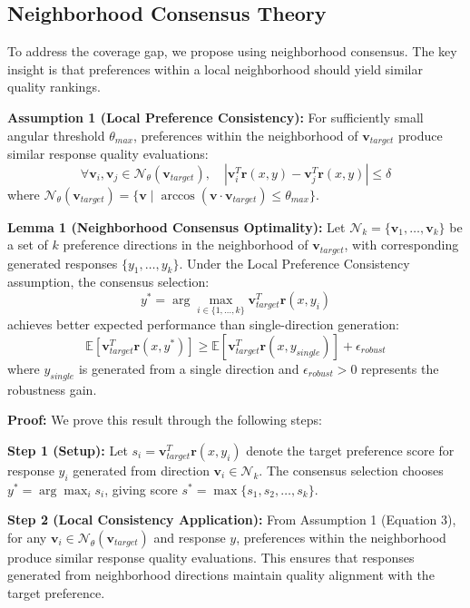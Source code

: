 \documentclass{article} %
\begin{document}
\subsection{Neighborhood Consensus Theory}

To address the coverage gap, we propose using neighborhood consensus. The key insight is that preferences within a local neighborhood should yield similar quality rankings.

\textbf{Assumption 1 (Local Preference Consistency):} For sufficiently small angular threshold $\theta_{max}$, preferences within the neighborhood of $\mathbf{v}_{target}$ produce similar response quality evaluations:
\begin{equation}
\forall \mathbf{v}_i, \mathbf{v}_j \in \mathcal{N}_\theta(\mathbf{v}_{target}), \quad |\mathbf{v}_i^T \mathbf{r}(x,y) - \mathbf{v}_j^T \mathbf{r}(x,y)| \leq \delta
\end{equation}
where $\mathcal{N}_\theta(\mathbf{v}_{target}) = \{\mathbf{v} \mid \arccos(\mathbf{v} \cdot \mathbf{v}_{target}) \leq \theta_{max}\}$.

\textbf{Lemma 1 (Neighborhood Consensus Optimality):} Let $\mathcal{N}_k = \{\mathbf{v}_1, \ldots, \mathbf{v}_k\}$ be a set of $k$ preference directions in the neighborhood of $\mathbf{v}_{target}$, with corresponding generated responses $\{y_1, \ldots, y_k\}$. Under the Local Preference Consistency assumption, the consensus selection:
\begin{equation}
y^* = \arg\max_{i \in \{1,\ldots,k\}} \mathbf{v}_{target}^T \mathbf{r}(x, y_i)
\end{equation}
achieves better expected performance than single-direction generation:
\begin{equation}
\mathbb{E}[\mathbf{v}_{target}^T \mathbf{r}(x, y^*)] \geq \mathbb{E}[\mathbf{v}_{target}^T \mathbf{r}(x, y_{single})] + \epsilon_{robust}
\end{equation}
where $y_{single}$ is generated from a single direction and $\epsilon_{robust} > 0$ represents the robustness gain.

\textbf{Proof:} We prove this result through the following steps:

\textbf{Step 1 (Setup):} Let $s_i = \mathbf{v}_{target}^T \mathbf{r}(x, y_i)$ denote the target preference score for response $y_i$ generated from direction $\mathbf{v}_i \in \mathcal{N}_k$. The consensus selection chooses $y^* = \arg\max_i s_i$, giving score $s^* = \max\{s_1, s_2, \ldots, s_k\}$.

\textbf{Step 2 (Local Consistency Application):} From Assumption 1 (Equation 3), for any $\mathbf{v}_i \in \mathcal{N}_\theta(\mathbf{v}_{target})$ and response $y$, preferences within the neighborhood produce similar response quality evaluations. This ensures that responses generated from neighborhood directions maintain quality alignment with the target preference.
\end{document}
